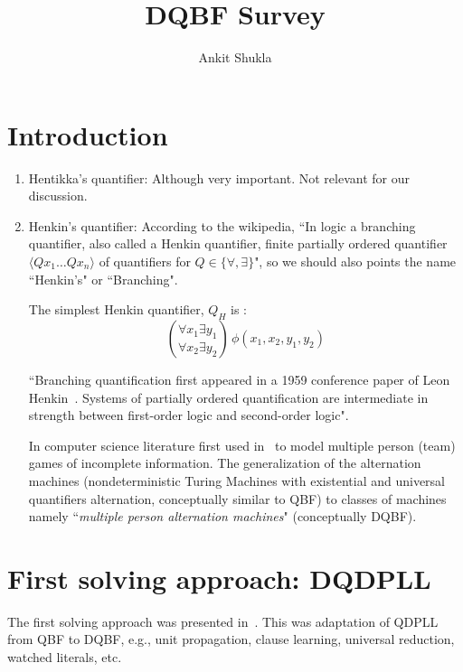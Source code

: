 \documentclass{article}
\begin{document}
\title{DQBF Survey}

\author{
    Ankit Shukla
}



\maketitle

\begin{abstract}

\end{abstract}

\section{Introduction}
\label{sec:intro}
\begin{enumerate}
  \item Hentikka's quantifier: Although very important. Not relevant for our discussion.
  \item Henkin's quantifier:
  According to the wikipedia, ``In logic a branching quantifier, also called a Henkin quantifier, finite partially ordered quantifier $\langle Qx_{1}\dots Qx_{n}\rangle$ 
  of quantifiers for $Q  \in \{\forall,\exists\}$", so we should also points the name ``Henkin's" or ``Branching".
   
  The simplest Henkin quantifier, $Q_{H}$ is :
  \begin{displaymath}
  \binom{\forall x_{1} \exists y_{1}}{\forall x_{2} \exists y_{2}} \, \phi(x_{1},x_{2},y_{1},y_{2})
  \end{displaymath}
  
  ``Branching quantification first appeared in a 1959 conference paper of Leon Henkin~\cite{henkin1961some}.
  Systems of partially ordered quantification are intermediate in strength between first-order logic and second-order logic".
  
  In computer science literature first used in~\cite{peterson1979multiple} to model multiple
  person (team) games of incomplete information.
  The generalization of the alternation machines (nondeterministic
  Turing Machines with existential and universal quantifiers alternation, conceptually similar to QBF) to classes of machines namely ``\textit{multiple person
  alternation machines}" (conceptually DQBF).
  
\end{enumerate}

\section{First solving approach: DQDPLL}
The first solving approach was presented in~\cite{frohlich2012dpll}.
%
This was adaptation of QDPLL from QBF to DQBF, e.g., unit propagation, clause
learning, universal reduction, watched literals, etc.
%
\end{document}
